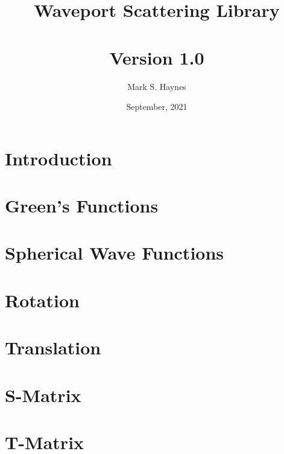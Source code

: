 \documentclass[10pt,letterpaper]{book}
\begin{document}


\date{September, 2021}
\title{Waveport Scattering Library  \\ \ \\  Version 1.0}
\author{Mark S. Haynes}
\maketitle





\tableofcontents

 \chapter{Introduction}
 


\chapter{Green's Functions}


\chapter{Spherical Wave Functions}
\label{chap:wavefunctions}


\chapter{Rotation}
\label{chap:rotation}


\chapter{Translation}
\label{chap:translation}


\chapter{S-Matrix}
\label{chap:smatrix}


\chapter{T-Matrix}
\label{chap:tmatrix}

\end{document}
